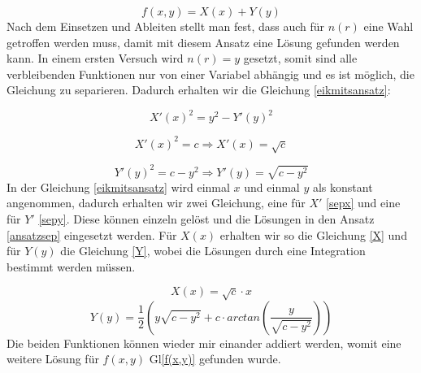 \begin{refsection}
\begin{equation}\label{ansatzsep}
f(x,y)=X(x) + Y(y)
\end{equation}
Nach dem Einsetzen und Ableiten stellt man fest, dass auch für $n(r)$ eine Wahl getroffen werden muss, damit mit diesem Ansatz eine Lösung gefunden werden kann. In einem ersten Versuch wird $n(r)=y$ gesetzt, somit sind alle verbleibenden Funktionen nur von einer Variabel abhängig und es ist möglich, die Gleichung zu separieren. Dadurch erhalten wir die Gleichung \eqref{eikmitsansatz}:

\begin{equation}\label{eikmitsansatz}
X'(x)^{2}=y^{2}-Y'(y)^{2}
\end{equation}

\begin{equation}\label{sepx}
X'(x)^{2}=c \Rightarrow X'(x)=\sqrt{c}
\end{equation}

\begin{equation}\label{sepy}
Y'(y)^{2}=c-y^{2}  \Rightarrow Y'(y)=\sqrt{c-y^{2}}
\end{equation}
In der Gleichung \eqref{eikmitsansatz} wird einmal $x$ und einmal $y$ als konstant angenommen, dadurch erhalten wir zwei Gleichung, eine für $X'$ \eqref{sepx} und eine für $Y'$ \eqref{sepy}. Diese können einzeln gelöst und die Lösungen in den Ansatz \eqref{ansatzsep} eingesetzt werden. Für $X(x)$ erhalten wir so die Gleichung \eqref{X} und für $Y(y)$ die Gleichung \eqref{Y}, wobei die Lösungen durch eine Integration bestimmt werden müssen.

\begin{equation}\label{X}
X(x)=\sqrt{c}\cdot x
\end{equation}
\begin{equation}\label{Y}
Y(y)=\dfrac{1}{2}\left(y \sqrt{c-y^{2}}+c \cdot arctan\left(  \dfrac{y}{\sqrt{c-y^{2}}}\right) \right) 
\end{equation}
Die beiden Funktionen können wieder mir einander addiert werden, womit eine weitere Lösung für $f(x,y)$  Gl\eqref{f(x,y)} gefunden wurde.


\end{refsection}
